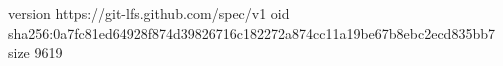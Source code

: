 version https://git-lfs.github.com/spec/v1
oid sha256:0a7fc81ed64928f874d39826716c182272a874cc11a19be67b8ebc2ecd835bb7
size 9619
